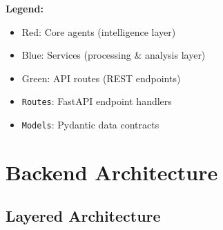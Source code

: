 \documentclass[11pt]{article}
\begin{document}
\textbf{Legend:}
\begin{itemize}
  \item \colorbox{red!20}{Red}: Core agents (intelligence layer)
  \item \colorbox{blue!20}{Blue}: Services (processing \& analysis layer)
  \item \colorbox{green!20}{Green}: API routes (REST endpoints)
  \item \texttt{Routes}: FastAPI endpoint handlers
  \item \texttt{Models}: Pydantic data contracts
\end{itemize}

\newpage

\section{Backend Architecture}

\subsection{Layered Architecture}
\end{document}
